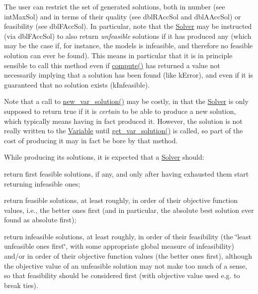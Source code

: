 The user can restrict the set of generated solutions, both in number (see int\+Max\+Sol) and in terms of their quality (see dbl\+R\+Acc\+Sol and dbl\+A\+Acc\+Sol) or feasibility (see dbl\+F\+Acc\+Sol). In particular, note that the \mbox{\hyperlink{class_s_m_spp__di__unipi__it_1_1_solver}{Solver}} may be instructed (via dbl\+F\+Acc\+Sol) to also return {\itshape unfeasible} solutions if it has produced any (which may be the case if, for instance, the models is infeasible, and therefore no feasible solution can ever be found). This means in particular that it is in principle sensible to call this method even if \mbox{\hyperlink{class_s_m_spp__di__unipi__it_1_1_solver_a504d4e3e174c7a518cc66156a8a45ce5}{compute()}} has returned a value not necessarily implying that a solution has been found (like k\+Error), and even if it is guaranteed that no solution exists (k\+Infeasible).

Note that a call to \mbox{\hyperlink{class_s_m_spp__di__unipi__it_1_1_solver_af109b504a566c90a4ea45c1574c128fe}{new\+\_\+var\+\_\+solution()}} may be costly, in that the \mbox{\hyperlink{class_s_m_spp__di__unipi__it_1_1_solver}{Solver}} is only supposed to return true if it is {\itshape certain} to be able to produce a new solution, which typically means having in fact produced it. However, the solution is not really written to the \mbox{\hyperlink{class_s_m_spp__di__unipi__it_1_1_variable}{Variable}} until \mbox{\hyperlink{class_s_m_spp__di__unipi__it_1_1_solver_a91d7cd0dc4fa453406ef30db2bfa37a5}{get\+\_\+var\+\_\+solution()}} is called, so part of the cost of producing it may in fact be bore by that method.

While producing its solutions, it is expected that a \mbox{\hyperlink{class_s_m_spp__di__unipi__it_1_1_solver}{Solver}} should\+:


\begin{DoxyItemize}
\item return first feasible solutions, if any, and only after having exhausted them start returning infeasible ones;
\item return feasible solutions, at least roughly, in order of their objective function values, i.\+e., the better ones first (and in particular, the absolute best solution ever found as absolute first);
\item return infeasible solutions, at least roughly, in order of their feasibility (the \char`\"{}least unfeasible ones first\char`\"{}, with some appropriate global measure of infeasibility) and/or in order of their objective function values (the better ones first), although the objective value of an unfeasible solution may not make too much of a sense, so that feasibility should be considered first (with objective value used e.\+g. to break ties).
\end{DoxyItemize}

